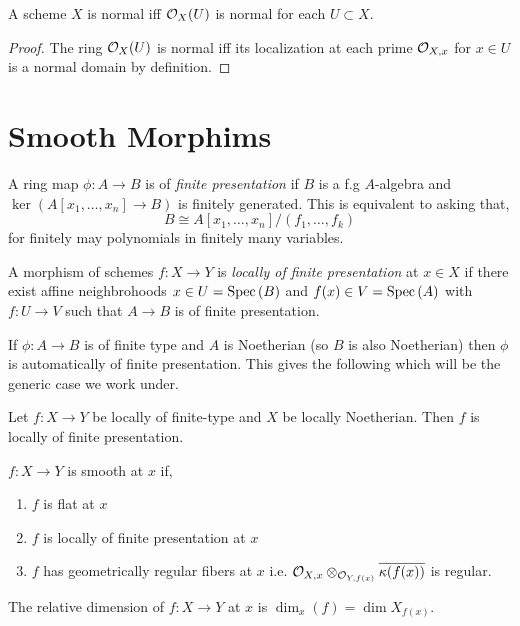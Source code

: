 \documentclass[12pt]{article}
\begin{document}
\begin{proposition}
A scheme $X$ is normal iff $\mathcal{O}_{X}(U)$ is normal for each $U \subset X$.
\end{proposition}

\begin{proof}
The ring $\mathcal{O}_{X}(U)$ is normal iff its localization at each prime $\mathcal{O}_{X, x}$  for $x \in U$ is a normal domain by definition.
\end{proof}

\section{Smooth Morphims}

\begin{definition}
A ring map $\phi : A \to B$ is of \textit{finite presentation} if $B$ is a f.g $A$-algebra and $\ker{(A[x_1, \dots, x_n] \to B)}$ is finitely generated. This is equivalent to asking that,
\[ B \cong A[x_1, \dots, x_n]/(f_1, \dots, f_k) \]
for finitely may polynomials in finitely many variables. 
\end{definition}

\begin{definition}
A morphism of schemes $f : X \to Y$ is \textit{locally of finite presentation} at $x \in X$ if there exist affine neighbrohoods $x \in U = \mathrm{Spec}\left( B \right)$ and $f(x) \in V = \mathrm{Spec}\left( A \right)$ with $f : U \to V$ such that $A \to B$ is of finite presentation. 
\end{definition}

\begin{remark}
If $\phi : A \to B$ is of finite type and $A$ is Noetherian (so $B$ is also Noetherian) then $\phi$ is automatically of finite presentation. This gives the following which will be the generic case we work under.
\end{remark}

\begin{proposition}
Let $f : X \to Y$ be locally of finite-type and $X$ be locally Noetherian. Then $f$ is locally of finite presentation. 
\end{proposition}

\begin{definition}
$f : X \to Y$ is smooth at $x$ if,
\begin{enumerate}
\item $f$ is flat at $x$
\item $f$ is locally of finite presentation at $x$
\item $f$ has geometrically regular fibers at $x$ i.e.
 $\mathcal{O}_{X, x} \otimes_{\mathcal{O}_{Y, f(x)}} \overline{\kappa(f(x))}$ is regular.
\end{enumerate}

\begin{definition}

\end{definition}
The  relative dimension of $f : X \to Y$ at $x$ is $\dim_x {(f)} = \dim X_{f(x)}$.
\end{definition}
\end{document}
